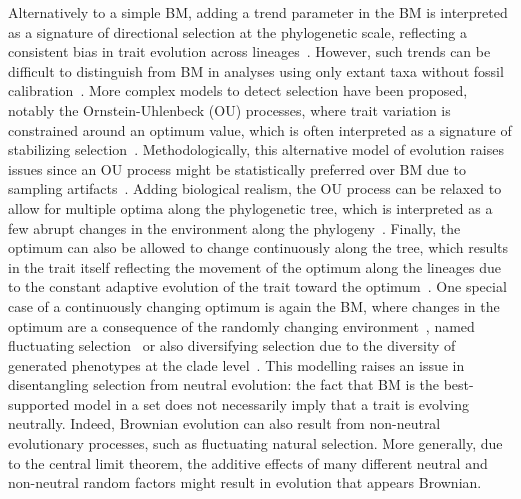 \documentclass{article}
\begin{document}
Alternatively to a simple BM, adding a trend parameter in the BM is interpreted as a signature of directional selection at the phylogenetic scale, reflecting a consistent bias in trait evolution across lineages~\citep{silvestro_early_2019}.
However, such trends can be difficult to distinguish from BM in analyses using only extant taxa without fossil calibration~\citep{felsenstein_phylogenies_1988a}.
More complex models to detect selection have been proposed, notably the Ornstein-Uhlenbeck (OU) processes, where trait variation is constrained around an optimum value, which is often interpreted as a signature of stabilizing selection~\citep{hansen_stabilizing_1997, butler_phylogenetic_2004, beaulieu_modeling_2012}.
Methodologically, this alternative model of evolution raises issues since an OU process might be statistically preferred over BM due to sampling artifacts~\citep{silvestro_measurement_2015, cooper_cautionary_2016, price_detecting_2022}.
Adding biological realism, the OU process can be relaxed to allow for multiple optima along the phylogenetic tree, which is interpreted as a few abrupt changes in the environment along the phylogeny~\citep{ingram_surface_2013, uyeda_novel_2014, khabbazian_fast_2016, mitov_fast_2020, grabowski_cautionary_2023}.
Finally, the optimum can also be allowed to change continuously along the tree, which results in the trait itself reflecting the movement of the optimum along the lineages due to the constant adaptive evolution of the trait toward the optimum~\citep{hansen_translating_1996, hansen_three_2024}.
One special case of a continuously changing optimum is again the BM, where changes in the optimum are a consequence of the randomly changing environment~\citep{hansen_comparative_2008}, named fluctuating selection~\citep{holstad_evolvability_2024} or also diversifying selection due to the diversity of generated phenotypes at the clade level~\citep{latrille_detecting_2024}.
This modelling raises an issue in disentangling selection from neutral evolution: the fact that BM is the best-supported model in a set does not necessarily imply that a trait is evolving neutrally.
Indeed, Brownian evolution can also result from non-neutral evolutionary processes, such as fluctuating natural selection.
More generally, due to the central limit theorem, the additive effects of many different neutral and non-neutral random factors might result in evolution that appears Brownian.
\end{document}
